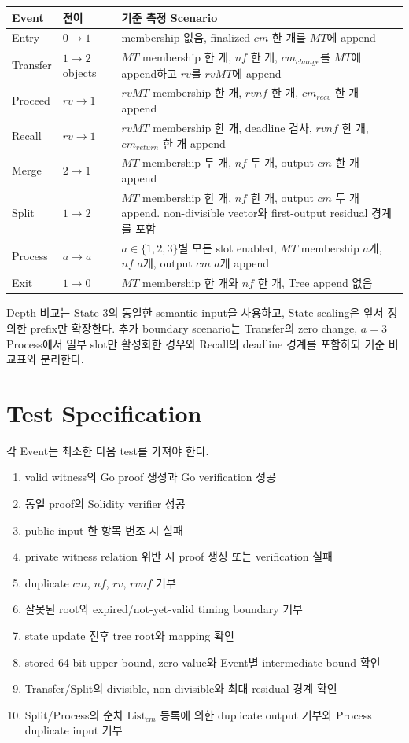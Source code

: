 \documentclass[11pt,a4paper]{extarticle}
\newcommand{\List}[1]{\mathrm{List}_{#1}}
\begin{document}
\begin{longtable}{@{}p{}p{}p{}@{}}
\toprule
Event & 전이 & 기준 측정 Scenario \\
\midrule
\endhead
Entry & $0\to1$ & membership 없음, finalized $cm$ 한 개를 $MT$에 append \\
Transfer & $1\to2$ objects & $MT$ membership 한 개, $nf$ 한 개, $cm_{change}$를 $MT$에
append하고 $rv$를 $rvMT$에 append \\
Proceed & $rv\to1$ & $rvMT$ membership 한 개, $rvnf$ 한 개, $cm_{recv}$ 한 개 append \\
Recall & $rv\to1$ & $rvMT$ membership 한 개, deadline 검사, $rvnf$ 한 개,
$cm_{return}$ 한 개 append \\
Merge & $2\to1$ & $MT$ membership 두 개, $nf$ 두 개, output $cm$ 한 개 append \\
Split & $1\to2$ & $MT$ membership 한 개, $nf$ 한 개, output $cm$ 두 개 append.
non-divisible vector와 first-output residual 경계를 포함 \\
Process & $a\to a$ & $a\in\{1,2,3\}$별 모든 slot enabled, $MT$ membership $a$개,
$nf$ $a$개, output $cm$ $a$개 append \\
Exit & $1\to0$ & $MT$ membership 한 개와 $nf$ 한 개, Tree append 없음 \\
\bottomrule
\end{longtable}

Depth 비교는 State 3의 동일한 semantic input을 사용하고, State scaling은 앞서 정의한
prefix만 확장한다. 추가 boundary scenario는 Transfer의 zero change, $a=3$ Process에서
일부 slot만 활성화한 경우와 Recall의 deadline 경계를 포함하되 기준 비교표와 분리한다.

\section{Test Specification}

각 Event는 최소한 다음 test를 가져야 한다.

\begin{enumerate}
  \item valid witness의 Go proof 생성과 Go verification 성공
  \item 동일 proof의 Solidity verifier 성공
  \item public input 한 항목 변조 시 실패
  \item private witness relation 위반 시 proof 생성 또는 verification 실패
  \item duplicate $cm$, $nf$, $rv$, $rvnf$ 거부
  \item 잘못된 root와 expired/not-yet-valid timing boundary 거부
  \item state update 전후 tree root와 mapping 확인
  \item stored 64-bit upper bound, zero value와 Event별 intermediate bound 확인
  \item Transfer/Split의 divisible, non-divisible와 최대 residual 경계 확인
  \item Split/Process의 순차 $\List{cm}$ 등록에 의한 duplicate output 거부와
        Process duplicate input 거부
\end{enumerate}
\end{document}
